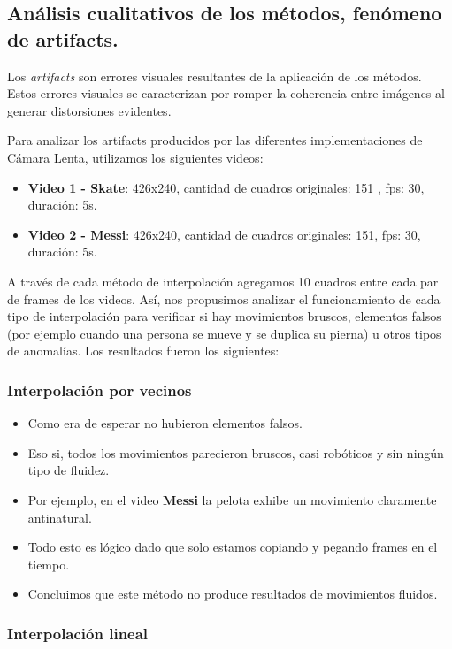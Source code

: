 \subsection{Análisis cualitativos de los métodos, fenómeno de artifacts.}
Los \textit{artifacts} son errores visuales resultantes de la aplicación de los métodos. Estos errores visuales se caracterizan por romper la coherencia entre imágenes al generar distorsiones evidentes.

Para analizar los artifacts producidos por las diferentes implementaciones de Cámara Lenta, utilizamos los siguientes videos:

\begin{itemize}
  \item \textbf{Video 1 - Skate}: 426x240, cantidad de cuadros originales: 151 , fps: 30, duración: 5s.
  \item \textbf{Video 2 - Messi}: 426x240, cantidad de cuadros originales: 151, fps: 30, duración: 5s.
\end{itemize}

A través de cada método de interpolación agregamos 10 cuadros entre cada par de frames de los videos.
Así, nos propusimos analizar el funcionamiento de cada tipo de interpolación para verificar si hay movimientos bruscos, elementos falsos (por ejemplo cuando una persona se mueve y se duplica su pierna) u otros tipos de anomalías.
Los resultados fueron los siguientes:

\subsubsection{Interpolación por vecinos}

\begin{itemize}
\item Como era de esperar no hubieron elementos falsos.
\item Eso si, todos los movimientos parecieron bruscos, casi robóticos y sin ningún tipo de fluidez.
\item Por ejemplo, en el video \textbf{Messi} la pelota exhibe un movimiento claramente antinatural.
\item Todo esto es lógico dado que solo estamos copiando y pegando frames en el tiempo.
\item Concluimos que este método no produce resultados de movimientos fluidos.
\end{itemize}

\subsubsection{Interpolación lineal}


